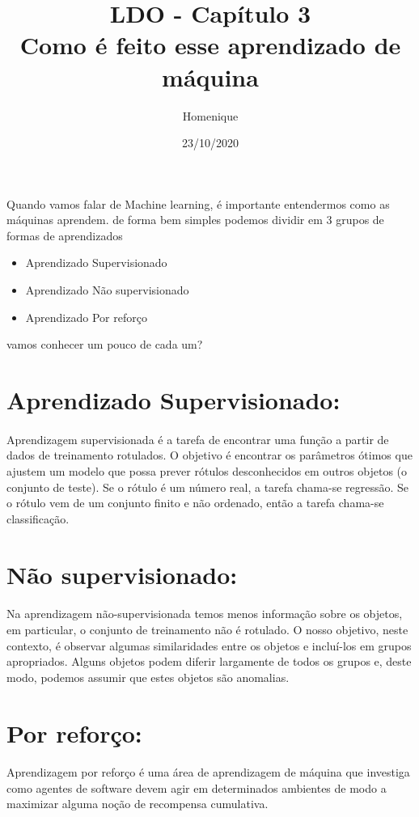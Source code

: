 \documentclass[12pt]{article}
\title{\textbf{LDO - Capítulo 3\\
Como é feito esse aprendizado de máquina}}
\author{Homenique}
\date{23/10/2020}
\begin{document}
    \maketitle

        Quando vamos falar de Machine learning, é importante entendermos como as máquinas aprendem. de forma bem simples podemos dividir em 3 grupos de formas de aprendizados 
        \begin{itemize}
            \item Aprendizado Supervisionado
            \item Aprendizado Não supervisionado
            \item Aprendizado Por reforço
          \end{itemize}
          vamos conhecer um pouco de cada um?

          \section{Aprendizado Supervisionado:}
            \paragraph{}Aprendizagem supervisionada é a tarefa de encontrar uma função a partir de dados de treinamento rotulados. O objetivo é encontrar os parâmetros ótimos que ajustem um modelo que possa prever rótulos desconhecidos em outros objetos (o conjunto de teste). Se o rótulo é um número real, a tarefa chama-se regressão. Se o rótulo vem de um conjunto finito e não ordenado, então a tarefa chama-se classificação.
            
          \section{Não supervisionado:}
            \paragraph{}Na aprendizagem não-supervisionada temos menos informação sobre os objetos, em particular, o conjunto de treinamento não é rotulado. O nosso objetivo, neste contexto, é observar algumas similaridades entre os objetos e incluí-los em grupos apropriados. Alguns objetos podem diferir largamente de todos os grupos e, deste modo, podemos assumir que estes objetos são anomalias.
          \section{Por reforço:}
            \paragraph{}Aprendizagem por reforço é uma área de aprendizagem de máquina que investiga como agentes de software devem agir em determinados ambientes de modo a maximizar alguma noção de recompensa cumulativa.
            
  
\end{document}
